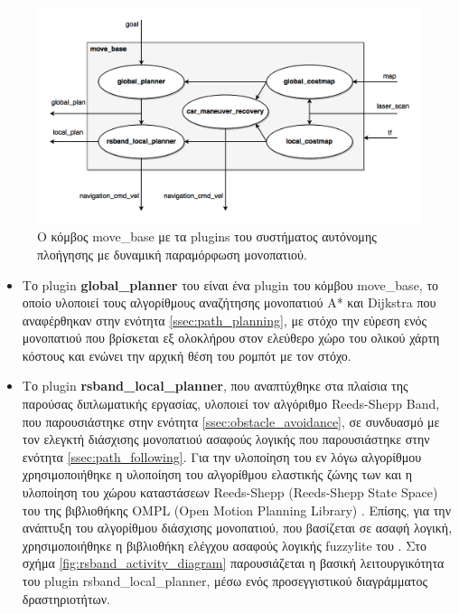 \begin{figure}[!ht]
	\centering
	\includegraphics[width=\linewidth]{Chapters/Chapter4/Figures/navigation_1_plugins.png}
	\caption{Ο κόμβος move{\_}base με τα plugins του συστήματος αυτόνομης πλοήγησης με δυναμική παραμόρφωση μονοπατιού.}
	\label{fig:navigation_1_plugins}
\end{figure}

\begin{itemize}
	\item Το plugin \textbf{global{\_}planner} του \citeauthor{global_planner} \cite{global_planner} είναι ένα plugin του κόμβου move{\_}base, το οποίο υλοποιεί τους αλγορίθμους αναζήτησης μονοπατιού A* και Dijkstra που αναφέρθηκαν στην ενότητα \ref{ssec:path_planning}, με στόχο την εύρεση ενός μονοπατιού που βρίσκεται εξ ολοκλήρου στον ελεύθερο χώρο του ολικού χάρτη κόστους και ενώνει την αρχική θέση του ρομπότ με τον στόχο.
	\item Το plugin \textbf{rsband{\_}local{\_}planner}, που αναπτύχθηκε στα πλαίσια της παρούσας διπλωματικής εργασίας, υλοποιεί τον αλγόριθμο Reeds-Shepp Band, που παρουσιάστηκε στην ενότητα \ref{ssec:obstacle_avoidance}, σε συνδυασμό με τον ελεγκτή διάσχισης μονοπατιού ασαφούς λογικής που παρουσιάστηκε στην ενότητα \ref{ssec:path_following}. Για την υλοποίηση του εν λόγω αλγορίθμου χρησιμοποιήθηκε η υλοποίηση του αλγορίθμου ελαστικής ζώνης των \citeauthor{eband_local_planner} \cite{eband_local_planner} και η υλοποίηση του χώρου καταστάσεων Reeds-Shepp (Reeds-Shepp State Space) του \citeauthor{reeds_shepp_ompl} \cite{reeds_shepp_ompl} της βιβλιοθήκης OMPL (Open Motion Planning Library) \cite{ompl}. Επίσης, για την ανάπτυξη του αλγορίθμου διάσχισης μονοπατιού, που βασίζεται σε ασαφή λογική, χρησιμοποιήθηκε η βιβλιοθήκη ελέγχου ασαφούς λογικής fuzzylite \cite{fuzzylite} του \citeauthor{fuzzylite}. Στο σχήμα \ref{fig:rsband_activity_diagram} παρουσιάζεται η βασική λειτουργικότητα του plugin rsband{\_}local{\_}planner, μέσω ενός προσεγγιστικού διαγράμματος δραστηριοτήτων.
\end{itemize}


